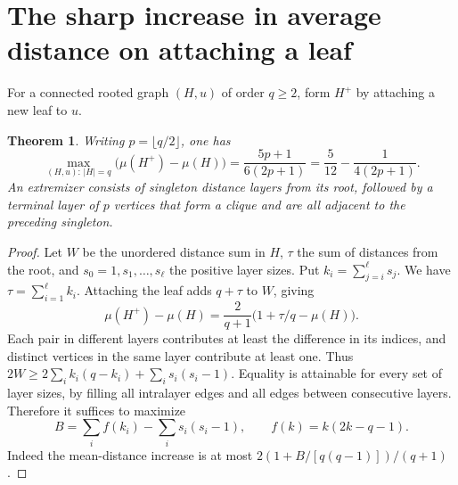 \documentclass[11pt,a4paper]{article}
\newtheorem{theorem}{Theorem}[section]
\begin{document}
\section{The sharp increase in average distance on attaching a leaf}
For a connected rooted graph $(H,u)$ of order $q\ge2$, form $H^+$ by
attaching a new leaf to $u$.
\begin{theorem}\label{p08-thm:leafresponse}
Writing $p=\lfloor q/2\rfloor$, one has
\[
 \max_{(H,u):\,|H|=q}\bigl(\mu(H^+)-\mu(H)\bigr)
   =\frac{5p+1}{6(2p+1)}
   =\frac5{12}-\frac1{4(2p+1)}.
\]
An extremizer consists of singleton distance layers from its root,
followed by a terminal layer of $p$ vertices that form a clique and
are all adjacent to the preceding singleton.
\end{theorem}
\begin{proof}
Let $W$ be the unordered distance sum in $H$, $\tau$ the sum of distances
from the root, and $s_0=1,s_1,\ldots,s_\ell$ the positive layer sizes.
Put $k_i=\sum_{j=i}^\ell s_j$. We have $\tau=\sum_{i=1}^\ell k_i$. Attaching the leaf adds $q+\tau$ to $W$, giving
\[
 \mu(H^+)-\mu(H)=\frac2{q+1}\bigl(1+\tau/q-\mu(H)\bigr).
\]
Each pair in different layers contributes at least the difference
in its indices, and distinct vertices in the same layer contribute
at least one. Thus $2W\ge 2\sum_i k_i(q-k_i)+\sum_i s_i(s_i-1)$.
Equality is attainable for every set of layer sizes, by filling all
intralayer edges and all edges between consecutive layers. Therefore
it suffices to maximize
\[
 B=\sum_i f(k_i)-\sum_i s_i(s_i-1),\qquad f(k)=k(2k-q-1).
\]
Indeed the mean-distance increase is at most
$2(1+B/[q(q-1)])/(q+1)$.


\end{proof}
\end{document}
